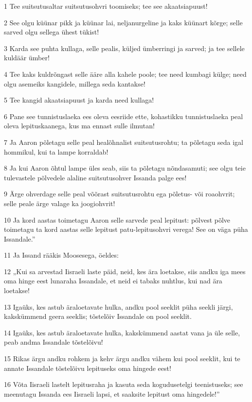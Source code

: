 \par 1 Tee suitsutusaltar suitsutusohvri toomiseks; tee see akaatsiapuust!
\par 2 See olgu küünar pikk ja küünar lai, neljanurgeline ja kaks küünart kõrge; selle sarved olgu sellega ühest tükist!
\par 3 Karda see puhta kullaga, selle pealis, küljed ümberringi ja sarved; ja tee sellele kuldäär ümber!
\par 4 Tee kaks kuldrõngast selle ääre alla kahele poole; tee need kumbagi külge; need olgu asemeiks kangidele, millega seda kantakse!
\par 5 Tee kangid akaatsiapuust ja karda need kullaga!
\par 6 Pane see tunnistuslaeka ees oleva eesriide ette, kohastikku tunnistuslaeka peal oleva lepituskaanega, kus ma ennast sulle ilmutan!
\par 7 Ja Aaron põletagu selle peal healõhnalist suitsutusrohtu; ta põletagu seda igal hommikul, kui ta lampe korraldab!
\par 8 Ja kui Aaron õhtul lampe üles seab, siis ta põletagu nõndasamuti; see olgu teie tulevastele põlvedele alaline suitsutusohver Issanda palge ees!
\par 9 Ärge ohverdage selle peal võõrast suitsutusrohtu ega põletus- või roaohvrit; selle peale ärge valage ka joogiohvrit!
\par 10 Ja kord aastas toimetagu Aaron selle sarvede peal lepitust: põlvest põlve toimetagu ta kord aastas selle lepitust patu-lepitusohvri verega! See on väga püha Issandale.”
\par 11 Ja Issand rääkis Moosesega, öeldes:
\par 12 „Kui sa arvestad Iisraeli laste päid, neid, kes ära loetakse, siis andku iga mees oma hinge eest lunaraha Issandale, et neid ei tabaks nuhtlus, kui nad ära loetakse!
\par 13 Igaüks, kes astub äraloetavate hulka, andku pool seeklit püha seekli järgi, kakskümmend geera seeklis; tõstelõiv Issandale on pool seeklit.
\par 14 Igaüks, kes astub äraloetavate hulka, kakskümmend aastat vana ja üle selle, peab andma Issandale tõstelõivu!
\par 15 Rikas ärgu andku rohkem ja kehv ärgu andku vähem kui pool seeklit, kui te annate Issandale tõstelõivu lepituseks oma hingede eest!
\par 16 Võta Iisraeli lastelt lepitusraha ja kasuta seda kogudusetelgi teenistuseks; see meenutagu Issanda ees Iisraeli lapsi, et saaksite lepitust oma hingedele!”
